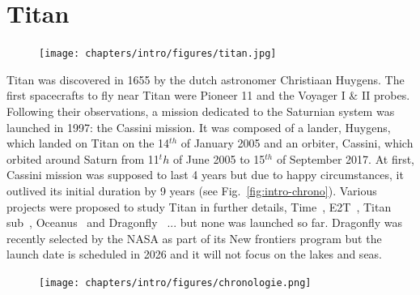 \section{Titan} 
\begin{figure}[H]
\begin{center}
\texttt{[image: chapters/intro/figures/titan.jpg]}
~ \\
\end{center}
\end{figure}
Titan was discovered in 1655 by the dutch astronomer Christiaan Huygens. The first spacecrafts to fly near Titan were Pioneer 11 and the Voyager I $\&$ II probes. Following their observations, a mission dedicated to the Saturnian system was launched in 1997: the Cassini mission. It was composed of a lander, Huygens, which landed on Titan on the 14$^{th}$ of January 2005 and an orbiter, Cassini, which orbited around Saturn from 11$^th$ of June 2005 to 15$^{th}$ of September 2017. At first, Cassini mission was supposed to last 4 years but due to happy circumstances, it outlived its initial duration by 9 years (see Fig.~\ref{fig:intro-chrono}). Various projects were proposed to study Titan in further details, Time~\citep{lorenz2012winds}, E2T~\citep{mitri2014exploration}, Titan sub~\citep{hartwig2016exploring}, Oceanus~\citep{sotin2017oceanus} and Dragonfly~\citep{turtle2017dragonfly} ... but none was launched so far. Dragonfly was recently selected by the NASA as part of its New frontiers program but the launch date is scheduled in 2026 and it will not focus on the lakes and seas.

\begin{figure}
\begin{center}
\texttt{[image: chapters/intro/figures/chronologie.png]}
~ \\
\end{center}
\end{figure}

